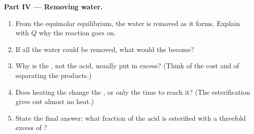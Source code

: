 \begin{problem}
\medskip
\noindent\textbf{Part IV --- Removing water.}
\begin{enumerate}[resume]
  \item From the equimolar equilibrium, the water is removed as it
        forms. Explain with $Q$ why the reaction goes on.
  \item If all the water could be removed, what would the  become?
  \item Why is the , not the acid, usually put in excess? (Think
        of the cost and of separating the products.)
  \item Does heating the  change the , or only the
        time to reach it? (The esterification gives out almost no heat.)
  \item State the final answer: what fraction of the acid is esterified
        with a threefold excess of ?
\end{enumerate}
\end{problem}
